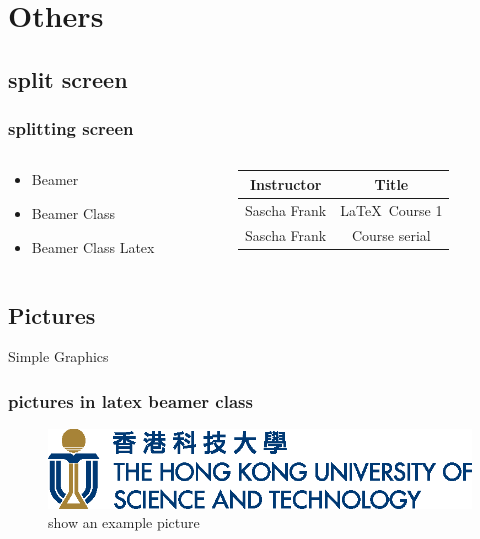 \documentclass{beamer}
\begin{document}
\section{Others}
\subsection{split screen}

\begin{frame}\frametitle{splitting screen}
	\begin{columns}
		\begin{column}{5cm}
			\begin{itemize}
				\item Beamer 
				\item Beamer Class 
				\item Beamer Class Latex 
			\end{itemize}
		\end{column}
		\begin{column}{5cm}
			\begin{tabular}{|c|c|}
				\hline
				\textbf{Instructor} & \textbf{Title} \\
				\hline
				Sascha Frank &  \LaTeX \ Course 1 \\
				\hline
				Sascha Frank &  Course serial  \\
				\hline
			\end{tabular}
		\end{column}
	\end{columns}
\end{frame}

\subsection{Pictures}{Simple Graphics} 
\begin{frame}\frametitle{pictures in latex beamer class}
	\begin{figure}
		\includegraphics[scale=1.0]{UST4C_L3} 
		\caption{show an example picture}
	\end{figure}
\end{frame}
\end{document}
